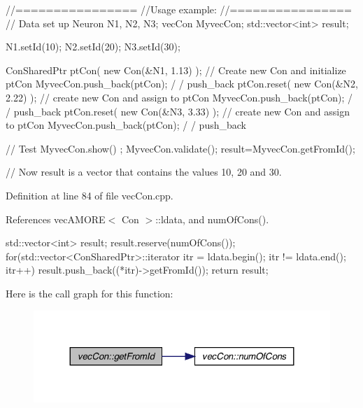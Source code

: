 \begin{DoxyCode}
  //================
  //Usage example:
  //================
        // Data set up
                        Neuron N1, N2, N3;
                        vecCon MyvecCon;
                        std::vector<int> result;

                        N1.setId(10);
                        N2.setId(20);
                        N3.setId(30);

                        ConSharedPtr ptCon( new Con(&N1, 1.13) );       // Create
       new Con and initialize ptCon
                        MyvecCon.push_back(ptCon);                              /
      / push_back
                        ptCon.reset(  new Con(&N2, 2.22) );             // create
       new Con and assign to ptCon
                        MyvecCon.push_back(ptCon);                              /
      / push_back
                        ptCon.reset(  new Con(&N3, 3.33) );             // create
       new Con and assign to ptCon
                        MyvecCon.push_back(ptCon);                              /
      / push_back

        // Test
                        MyvecCon.show() ;
                        MyvecCon.validate();
                        result=MyvecCon.getFromId();

        // Now result is a vector that contains the values 10, 20 and 30.
\end{DoxyCode}
 

Definition at line 84 of file vecCon.cpp.



References vecAMORE$<$ Con $>$::ldata, and numOfCons().


\begin{DoxyCode}
                                  {
        std::vector<int> result;
        result.reserve(numOfCons());
        for(std::vector<ConSharedPtr>::iterator itr = ldata.begin();   itr != 
      ldata.end();   itr++)   { result.push_back((*itr)->getFromId()); }
        return result;
}
\end{DoxyCode}


Here is the call graph for this function:\nopagebreak
\begin{figure}[H]
\begin{center}
\leavevmode
\includegraphics[width=324pt]{classvec_con_aa9f3f5df4c4060951c975c4c829b8471_cgraph}
\end{center}
\end{figure}


